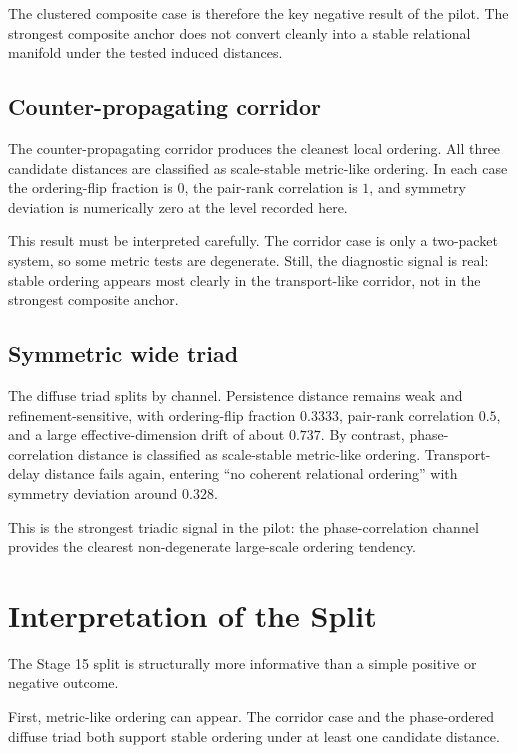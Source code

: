 \documentclass[11pt]{article}
\begin{document}
The clustered composite case is therefore the key negative result of the pilot. The strongest composite anchor does not convert cleanly into a stable relational manifold under the tested induced distances.

\subsection{Counter-propagating corridor}

The counter-propagating corridor produces the cleanest local ordering. All three candidate distances are classified as scale-stable metric-like ordering. In each case the ordering-flip fraction is \(0\), the pair-rank correlation is \(1\), and symmetry deviation is numerically zero at the level recorded here.

This result must be interpreted carefully. The corridor case is only a two-packet system, so some metric tests are degenerate. Still, the diagnostic signal is real: stable ordering appears most clearly in the transport-like corridor, not in the strongest composite anchor.

\subsection{Symmetric wide triad}

The diffuse triad splits by channel. Persistence distance remains weak and refinement-sensitive, with ordering-flip fraction \(0.3333\), pair-rank correlation \(0.5\), and a large effective-dimension drift of about \(0.737\). By contrast, phase-correlation distance is classified as scale-stable metric-like ordering. Transport-delay distance fails again, entering ``no coherent relational ordering'' with symmetry deviation around \(0.328\).

This is the strongest triadic signal in the pilot: the phase-correlation channel provides the clearest non-degenerate large-scale ordering tendency.

\section{Interpretation of the Split}

The Stage 15 split is structurally more informative than a simple positive or negative outcome.

First, metric-like ordering can appear. The corridor case and the phase-ordered diffuse triad both support stable ordering under at least one candidate distance.
\end{document}
